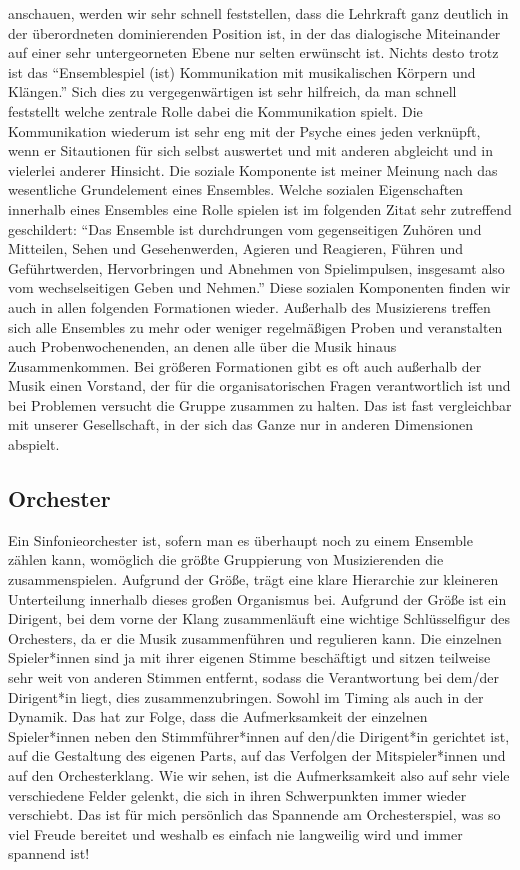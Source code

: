 anschauen, werden wir sehr schnell feststellen, dass die Lehrkraft ganz deutlich in
der überordneten dominierenden Position ist, in der das dialogische Miteinander
auf einer sehr untergeorneten Ebene nur selten erwünscht ist. Nichts desto trotz
ist das \enquote{Ensemblespiel (ist) Kommunikation mit musikalischen Körpern und
Klängen.} \autocite[62]{doerne:umfassend_musizieren} Sich dies zu
vergegenwärtigen ist sehr hilfreich, da man schnell feststellt welche zentrale
Rolle dabei die Kommunikation spielt. Die Kommunikation wiederum ist sehr eng
mit der Psyche eines jeden verknüpft, wenn er Sitautionen für sich selbst
auswertet und mit anderen abgleicht und in vielerlei anderer Hinsicht. Die
soziale Komponente ist meiner Meinung nach das wesentliche Grundelement eines
Ensembles. Welche sozialen Eigenschaften innerhalb eines Ensembles eine Rolle
spielen ist im folgenden Zitat sehr zutreffend geschildert: \enquote{Das
Ensemble ist durchdrungen vom gegenseitigen Zuhören und Mitteilen, Sehen und
Gesehenwerden, Agieren und Reagieren, Führen und Geführtwerden, Hervorbringen
und Abnehmen von Spielimpulsen, insgesamt also vom wechselseitigen Geben und
Nehmen.} \autocite[62]{doerne:umfassend_musizieren} Diese sozialen Komponenten
finden wir auch in allen folgenden Formationen wieder. Außerhalb des Musizierens
treffen sich alle Ensembles zu mehr oder weniger regelmäßigen Proben und
veranstalten auch Probenwochenenden, an denen alle über die Musik hinaus
Zusammenkommen. Bei größeren Formationen gibt es oft auch außerhalb der Musik
einen Vorstand, der für die organisatorischen Fragen verantwortlich ist und bei
Problemen versucht die Gruppe zusammen zu halten. Das ist fast vergleichbar mit
unserer Gesellschaft, in der sich das Ganze nur in anderen Dimensionen abspielt.


\subsection{Orchester} 

Ein Sinfonieorchester ist, sofern man es überhaupt noch zu einem Ensemble
zählen kann, womöglich die größte Gruppierung von Musizierenden die
zusammenspielen. Aufgrund der Größe, trägt eine klare Hierarchie zur kleineren
Unterteilung innerhalb dieses großen Organismus bei. Aufgrund der Größe ist ein
Dirigent, bei dem vorne der Klang zusammenläuft eine wichtige
Schlüsselfigur des Orchesters, da er die Musik zusammenführen und regulieren
kann. Die einzelnen Spieler*innen sind ja mit ihrer eigenen Stimme beschäftigt
und sitzen teilweise sehr weit von anderen Stimmen entfernt, sodass die
Verantwortung bei dem/der Dirigent*in liegt, dies zusammenzubringen. Sowohl im
Timing als auch in der Dynamik. Das hat zur Folge, dass die Aufmerksamkeit der
einzelnen Spieler*innen neben den Stimmführer*innen auf den/die Dirigent*in
gerichtet ist, auf die Gestaltung des eigenen Parts, auf das Verfolgen der
Mitspieler*innen und auf den Orchesterklang.
\autocite[56]{doerne:umfassend_musizieren} Wie wir sehen, ist die Aufmerksamkeit
also auf sehr viele verschiedene Felder gelenkt, die sich in ihren Schwerpunkten
immer wieder verschiebt. Das ist für mich persönlich das Spannende am
Orchesterspiel, was so viel Freude bereitet und weshalb es einfach nie
langweilig wird und immer spannend ist!

